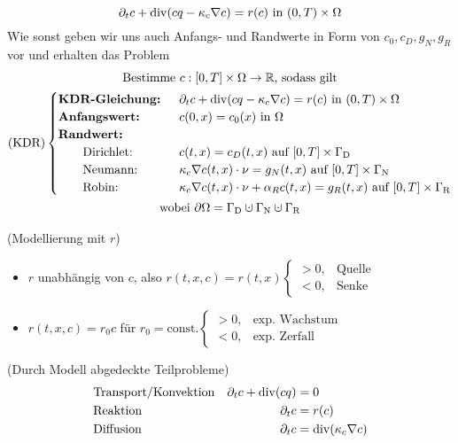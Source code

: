 \[ \partial_t c + \operatorname{div}(c q - \kappa_c \nabla c) = r(c) \text{ in } (0,T) \times \Omega \]
Wie sonst geben wir uns auch Anfangs- und Randwerte in Form von $ c_0, c_D, g_N, g_R $vor und erhalten das Problem
\begin{gather*}
	\text{Bestimme } c:[0,T] \times \Omega \to \R \text{, sodass gilt}\\
	\KDR \begin{cases}
		\text{\textbf{KDR-Gleichung: }}&\partial_t c + \dive(c q - \kappa_c \nabla c) = r(c) \text{ in } (0,T) \times \Omega\\
		\text{\textbf{Anfangswert: }} &c(0,x) = c_0(x) \text{ in } \Omega\\
		\text{\textbf{Randwert:}}\\
		\qquad \text{Dirichlet: } &c(t,x) = c_D(t,x) \text{ auf } [0,T] \times \GammaD \\
		\qquad \text{Neumann: } &\kappa_c \nabla c(t,x) \cdot \nu = g_N(t,x) \text{ auf } [0,T] \times \GammaN \\
		\qquad \text{Robin: } &\kappa_c \nabla c(t,x) \cdot \nu + \alpha_R c(t,x) = g_R(t,x) \text{ auf } [0,T] \times \GammaR
	\end{cases}\\
	\text{wobei } \partial \Omega = \GammaD \cupdot \GammaN \cupdot \GammaR
\end{gather*}

\begin{remark}
	(Modellierung mit $ r $)
	\begin{itemize}
		\item $ r $ unabhängig von $ c $, also $ r(t,x,c) = r(t,x) \begin{cases}
		> 0, &\text{Quelle}\\
		< 0, &\text{Senke}
		\end{cases} $
		\item $ r(t,x,c) = r_0 c $ für $ r_0 = \text{const.} \begin{cases}
		> 0, &\text{exp. Wachstum}\\
		< 0, &\text{exp. Zerfall}
		\end{cases} $
	\end{itemize}
\end{remark}

\begin{remark}
	(Durch Modell abgedeckte Teilprobleme)
	\begin{align*}
	&\text{Transport/Konvektion} & \partial_t c + \operatorname{div}(cq) &= 0\\
	&\text{Reaktion} & \partial_t c &= r(c)\\
	&\text{Diffusion} & \partial_t c &= \operatorname{div}(\kappa_c \nabla c)
	\end{align*}
\end{remark}

